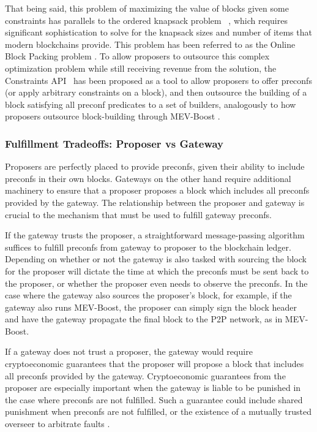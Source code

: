\documentclass[a4paper]{article}
\theoremstyle{boldstyle}
\begin{document}
That being said, this problem of maximizing the value of blocks given some constraints has parallels to the ordered knapsack problem ~\cite{P:Partiallyorderedknapsackandapplicationstoscheculing}, which requires significant sophistication to solve for the knapsack sizes and number of items that modern blockchains provide. This problem has been referred to as the Online Block Packing problem \cite{OnlineBlockPacking}. To allow proposers to outsource this complex optimization problem while still receiving revenue from the solution, the Constraints API~\cite{W:ConstraintsAPISpecification} has been proposed as a tool to allow proposers to offer preconfs (or apply arbitrary constraints on a block), and then outsource the building of a block satisfying all preconf predicates to a set of builders, analogously to how proposers outsource block-building through MEV-Boost \cite{MEV-Boost}. 

\subsubsection{Fulfillment Tradeoffs: Proposer vs Gateway}
\label{delivery_tradeoffs}

Proposers are perfectly placed to provide preconfs, given their ability to include preconfs in their own blocks. Gateways on the other hand require additional machinery to ensure that a proposer proposes a block which includes all preconfs provided by the gateway. The relationship between the proposer and gateway is crucial to the mechanism that must be used to fulfill gateway preconfs. 

If the gateway trusts the proposer, a straightforward message-passing algorithm suffices to fulfill preconfs from gateway to proposer to the blockchain ledger. Depending on whether or not the gateway is also tasked with sourcing the block for the proposer will dictate the time at which the preconfs must be sent back to the proposer, or whether the proposer even needs to observe the preconfs. In the case where the gateway also sources the proposer's block, for example, if the gateway also runs MEV-Boost, the proposer can simply sign the block header and have the gateway propagate the final block to the P2P network, as in MEV-Boost.

If a gateway does not trust a proposer, the gateway would require cryptoeconomic guarantees that the proposer will propose a block that includes all preconfs provided by the gateway. Cryptoeconomic guarantees from the proposer are especially important when the gateway is liable to be punished in the case where preconfs are not fulfilled. Such a guarantee could include shared punishment when preconfs are not fulfilled, or the existence of a mutually trusted overseer to arbitrate faults \cite{W:PreconfirmationFairExchange,W:FaultAttribution}. 
\end{document}
